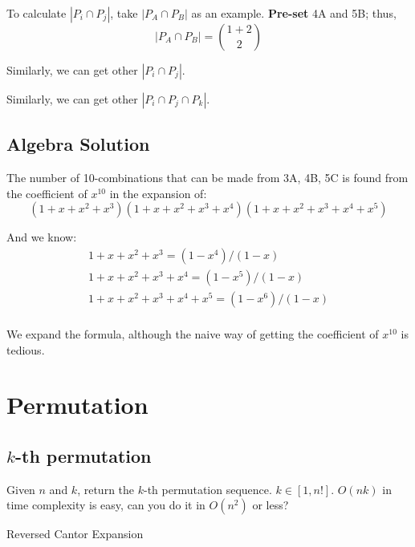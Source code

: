 To calculate $|P_i \cap P_j|$, take $|P_A \cap P_B|$ as an example. \textbf{Pre-set} 4A and 5B; thus,
$$
|P_A \cap P_B| = {1+2 \choose 2}
$$

Similarly, we can get other $|P_i \cap P_j|$.

Similarly, we can get other $|P_i \cap P_j \cap P_k|$.
\subsection{Algebra Solution}
The number of 10-combinations that can be made from 3A, 4B, 5C is found from the coefficient of $x^{10}$ in the expansion of:
$$
(1+x+x^2+x^3)(1+x+x^2+x^3+x^4)(1+x+x^2+x^3+x^4+x^5)
$$

And we know:
\begin{eqnarray*}
1+x+x^2+x^3         = (1-x^4)/(1-x)  \\
1+x+x^2+x^3+x^4     = (1-x^5)/(1-x)  \\
1+x+x^2+x^3+x^4+x^5 = (1-x^6)/(1-x)  \\
\end{eqnarray*}


We expand the formula, although the  naive way of getting the coefficient of $x^{10}$ is tedious. 

\section{Permutation}

\subsection{$k$-th permutation}
Given $n$ and $k$, return the $k$-th permutation sequence. $k\in [1, n!]$. $O(nk)$ in time complexity is easy, can you do it in $O(n^2)$ or less?

Reversed Cantor Expansion

